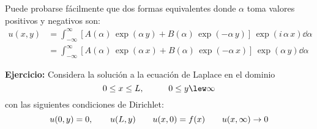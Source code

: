 Puede probarse fácilmente que dos formas equivalentes donde $\alpha$ toma valores positivos y negativos son:
\begin{align*}
u(x, y) &= \int_{-\infty}^{\infty} \left[ A(\alpha) \, \exp(\alpha \, y) + B(\alpha) \, \exp(-\alpha \, y) \right] \, \exp(i \, \alpha \, x) \dd{\alpha} \\[1em]
&= \int_{-\infty}^{\infty} \left[ A(\alpha) \, \exp(\alpha \, x) + B(\alpha) \, \exp(-\alpha \, x) \right] \, \exp(\alpha \, y) \dd{\alpha}
\end{align*}
\par
\textbf{Ejercicio:} Considera la solución a la ecuación de Laplace en el dominio
\[ 0 \leq x \leq L, \hspace{1cm} 0 \leq y \lew \infty \]
con las siguientes condiciones de Dirichlet:
\[ u(0, y) = 0, \hspace{0.7cm} u(L, y) \hspace{0.7cm} u(x, 0) = f(x) \hspace{0.7cm} u(x, \infty) \to 0 \]
